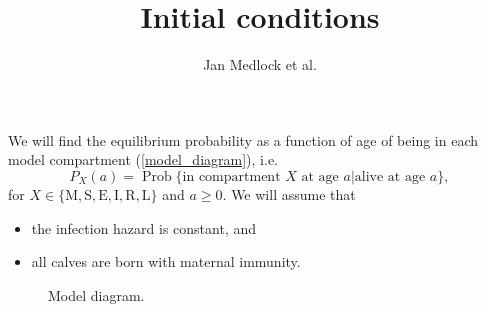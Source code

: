 \documentclass[12pt]{article}
\title{Initial conditions}
\author{Jan Medlock et al.}
\DeclareMathOperator{\Prob}{Prob}
\begin{document}
\maketitle

We will find the equilibrium probability as a function of age of being
in each model compartment (\autoref{model_diagram}), i.e.
\begin{equation}
  P_X(a) = \Prob\{\text{in compartment $X$ at age $a$}|\text{alive at
    age $a$}\},
\end{equation}
for $X \in \{\mathrm{M}, \mathrm{S}, \mathrm{E}, \mathrm{I},
\mathrm{R}, \mathrm{L}\}$
and $a \geq 0$.
We will assume that
\begin{itemize}
\item the infection hazard is constant, and
\item all calves are born with maternal immunity.
\end{itemize}

\begin{figure}
  \begin{center}
    
  \end{center}
  \caption{Model diagram.}
  \label{model_diagram}
\end{figure}

\clearpage
\end{document}
